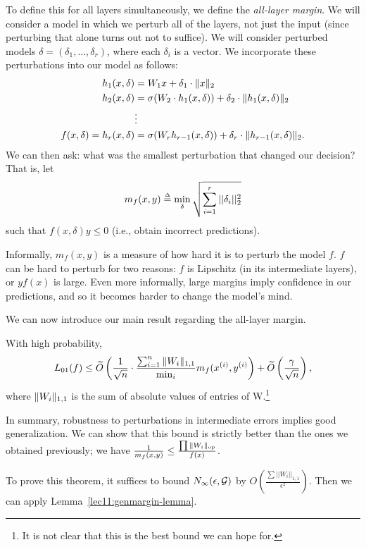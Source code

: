 To define this for all layers simultaneously, we define the \textit{all-layer margin}. We will consider a model in which we perturb all of the layers, not just the input (since perturbing that alone turns out not to suffice). We will consider perturbed models $\delta = (\delta_1, ..., \delta_r)$, where each $\delta_i$ is a vector. We incorporate these perturbations into our model as follows:
\begin{align}
    h_1(x, \delta) &= W_1 x + \delta_1 \cdot \|x\|_2 \\
    h_2(x, \delta) &= \sigma(W_2 \cdot h_1(x, \delta)) + \delta_2 \cdot \|h_1(x, \delta)\|_2 \\
    &\vdots \\
    f(x, \delta) = h_r(x, \delta) &= \sigma(W_r h_{r - 1}(x, \delta)) + \delta_r \cdot \|h_{r - 1}(x, \delta)\|_2.
\end{align}
We can then ask: what was the smallest perturbation that changed our decision? That is, let
\begin{align}
    m_f(x, y) \defeq \min_\delta \sqrt{\sum_{i=1}^r ||\delta_i||_2^2} 
\end{align}
such that $f(x, \delta)y \leq 0$ (i.e., obtain incorrect predictions).

Informally, $m_f(x, y)$ is a measure of how hard it is to perturb the model $f$. $f$ can be hard to perturb for two reasons: $f$ is Lipschitz (in its intermediate layers), or $yf(x)$ is large. Even more informally, large margins imply confidence in our predictions, and so it becomes harder to change the model's mind.

We can now introduce our main result regarding the all-layer margin.
\begin{theorem}
With high probability,
\begin{equation}
L_{01}(f) \leq \widetilde{O}\left (\frac{1}{\sqrt{n}} \cdot \frac{\sum_{i=1}^n \|W_i\|_{1, 1}}{\min_i} m_f(x^{(i)}, y^{(i)}\right ) + \widetilde{O}\left (\frac{\gamma}{\sqrt{n}}\right ),
\end{equation}
where
$\|W_i\|_{1, 1}$ is the sum of absolute values of entries of W.\footnote{It is not clear that this is the best bound we can hope for.}
\end{theorem}
In summary, robustness to perturbations in intermediate errors implies good generalization. We can show that this bound is strictly better than the ones we obtained previously; we have $\frac{1}{m_f(x, y)} \leq \frac{\prod \|W_i\|_{\text{op}}}{f(x)}$.

To prove this theorem, it suffices to bound $N_\infty(\epsilon, \mathcal G)$ by $O(\frac{\sum{||W_i||_{1, 1}}}{\epsilon^2})$. Then we can apply Lemma~\ref{lec11:genmargin-lemma}.

